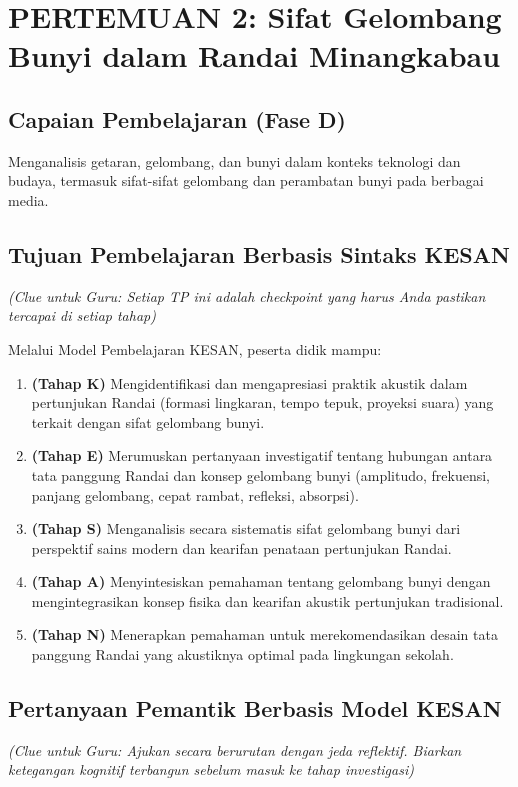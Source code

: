\documentclass[12pt,a4paper]{article}
\begin{document}
\section{PERTEMUAN 2: Sifat Gelombang Bunyi dalam Randai Minangkabau}

\subsection{Capaian Pembelajaran (Fase D)}
Menganalisis getaran, gelombang, dan bunyi dalam konteks teknologi dan budaya, termasuk sifat-sifat gelombang dan perambatan bunyi pada berbagai media.

\subsection{Tujuan Pembelajaran Berbasis Sintaks KESAN}
\textit{(Clue untuk Guru: Setiap TP ini adalah checkpoint yang harus Anda pastikan tercapai di setiap tahap)}

Melalui Model Pembelajaran KESAN, peserta didik mampu:

\begin{enumerate}
\item \textbf{(Tahap K)} Mengidentifikasi dan mengapresiasi praktik akustik dalam pertunjukan Randai (formasi lingkaran, tempo tepuk, proyeksi suara) yang terkait dengan sifat gelombang bunyi.
\item \textbf{(Tahap E)} Merumuskan pertanyaan investigatif tentang hubungan antara tata panggung Randai dan konsep gelombang bunyi (amplitudo, frekuensi, panjang gelombang, cepat rambat, refleksi, absorpsi).
\item \textbf{(Tahap S)} Menganalisis secara sistematis sifat gelombang bunyi dari perspektif sains modern dan kearifan penataan pertunjukan Randai.
\item \textbf{(Tahap A)} Menyintesiskan pemahaman tentang gelombang bunyi dengan mengintegrasikan konsep fisika dan kearifan akustik pertunjukan tradisional.
\item \textbf{(Tahap N)} Menerapkan pemahaman untuk merekomendasikan desain tata panggung Randai yang akustiknya optimal pada lingkungan sekolah.
\end{enumerate}

\subsection{Pertanyaan Pemantik Berbasis Model KESAN}
\textit{(Clue untuk Guru: Ajukan secara berurutan dengan jeda reflektif. Biarkan ketegangan kognitif terbangun sebelum masuk ke tahap investigasi)}
\end{document}

